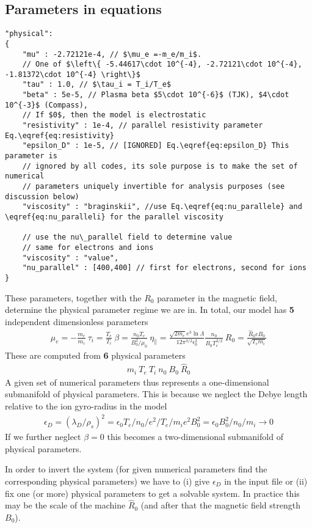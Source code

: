\subsection{Parameters in equations}
\begin{verbatim}
"physical":
{
    "mu" : -2.72121e-4, // $\mu_e =-m_e/m_i$.
    // One of $\left\{ -5.44617\cdot 10^{-4}, -2.72121\cdot 10^{-4}, -1.81372\cdot 10^{-4} \right\}$
    "tau" : 1.0, // $\tau_i = T_i/T_e$
    "beta" : 5e-5, // Plasma beta $5\cdot 10^{-6}$ (TJK), $4\cdot 10^{-3}$ (Compass),
    // If $0$, then the model is electrostatic
    "resistivity" : 1e-4, // parallel resistivity parameter Eq.\eqref{eq:resistivity}
    "epsilon_D" : 1e-5, // [IGNORED] Eq.\eqref{eq:epsilon_D} This parameter is
    // ignored by all codes, its sole purpose is to make the set of numerical
    // parameters uniquely invertible for analysis purposes (see discussion below)
    "viscosity" : "braginskii", //use Eq.\eqref{eq:nu_parallele} and \eqref{eq:nu_paralleli} for the parallel viscosity

    // use the nu\_parallel field to determine value
    // same for electrons and ions
    "viscosity" : "value",
    "nu_parallel" : [400,400] // first for electrons, second for ions
}
\end{verbatim}
These parameters, together with the $R_0$ parameter in the magnetic field,
determine the physical parameter regime we are in.
In total, our model has \textbf{5} independent dimensionless parameters
\begin{align*}
    \mu_e = -\frac{m_e}{m_i}\ \tau_i = \frac{T_e}{T_i}\ \beta =
    \frac{n_0T_{e}}{B_0^2/\mu_0}\ \eta_\parallel = \frac{\sqrt{2m_e} e^3 \ln
    \Lambda} {12\pi^{3/2} \epsilon_0^2} \frac{n_0} {B_0T_e^{3/2}} \ R_0
    = \frac{\hat R_0 e B_0}{\sqrt{T_{e}m_i}}
\end{align*}
These are computed from \textbf{6} physical parameters
\begin{align*}
    m_i\ T_e\ T_i\ n_0\ B_0\ \hat R_0
\end{align*}
 A given set of numerical parameters thus represents a one-dimensional
 submanifold of physical parameters.
 This is because we neglect the Debye length relative to the ion gyro-radius
 in the model
 \begin{align}\label{eq:epsilon_D}
     \epsilon_D = (\lambda_D/\rho_s)^2 = \epsilon_0 T_e /n_0 /e^2 / T_e/m_i e^2 B_0^2 = \epsilon_0 B_0^2/n_0 /m_i \rightarrow 0
 \end{align}
If we further neglect $\beta=0$ this becomes a two-dimensional submanifold
of physical parameters.
\begin{tcolorbox}[title=Note]
    In order to invert the system (for given numerical parameters find the
    corresponding physical parameters) we have to (i) give $\epsilon_D$ in the
    input file or (ii) fix one (or more) physical
    parameters to get a solvable system.  In practice this may be the scale of
    the machine $\hat R_0$ (and after that the magnetic field strength $B_0$).
\end{tcolorbox}
